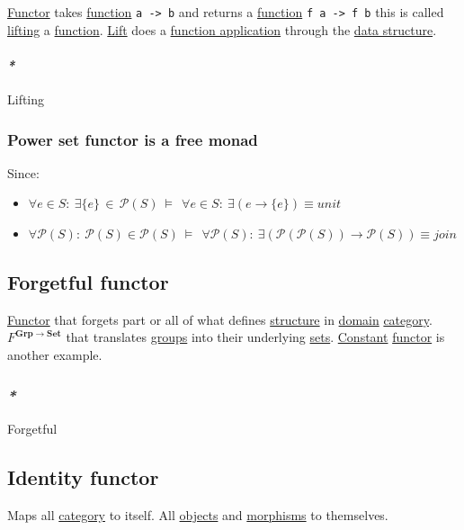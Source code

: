 \documentclass[a4paper,14pt,oneside]{book}
\begin{document}
\hyperref[org878310f]{Functor} takes \hyperref[org50bbe06]{function} \texttt{a -> b} and returns a \hyperref[org50bbe06]{function} \texttt{f a -> f b} this is called \hyperref[org07b6304]{lifting} a \hyperref[org50bbe06]{function}.
\hyperref[org7d3a14c]{Lift} does a \hyperref[org3337eca]{function application} through the \hyperref[org3c02f70]{data structure}.

\paragraph{\emph{*}}
\label{sec:orgd7b99fc}

\label{org07b6304}Lifting

\subsubsection{\label{org63560ac}Power set functor is a free monad}
\label{sec:org9034a21}
Since:
\begin{itemize}
\item \(\forall e \in S : \ \exists \{e\} \, \in \, {\mathcal{P}(S)} \ \vDash \ \ \forall e \in S : \ \exists (e \to \{e\}) \equiv unit\)
\item \(\forall \mathcal{P}(S) : \ \mathcal{P}(S) \in \mathcal{P}(S) \ \vDash \ \ \forall \mathcal{P}(S) : \ \exists (\mathcal{P}(\mathcal{P}(S)) \to \mathcal{P}(S)) \equiv join\)
\end{itemize}

\subsection{\label{orgc8b9bad}Forgetful functor}
\label{sec:orgcc5a999}
\hyperref[org878310f]{Functor} that forgets part or all of what defines \hyperref[org156091f]{structure} in \hyperref[org96f0f5e]{domain} \hyperref[org77f032a]{category}.
\(F^{\mathbf {Grp} \to \mathbf {Set}}\) that translates \hyperref[orgcdff3e5]{groups} into their underlying \hyperref[org9f97b40]{sets}.
\hyperref[org204ed27]{Constant} \hyperref[org878310f]{functor} is another example.

\subsubsection{\emph{*}}
\label{sec:orgca13262}

\label{org2d5852e}Forgetful

\subsection{\label{org7db70e2}Identity functor}
\label{sec:org97ec2a4}
Maps all \hyperref[org77f032a]{category} to itself. All \hyperref[orgcb7c876]{objects} and \hyperref[orgd994d44]{morphisms} to themselves.
\end{document}
